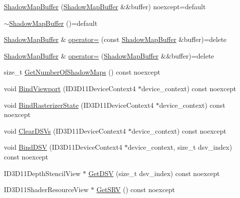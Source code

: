 \begin{DoxyCompactItemize}
\hyperlink{structmage_1_1_shadow_map_buffer_a0aa29978a2c482614aa1c46e9be0b50a}{Shadow\+Map\+Buffer} (\hyperlink{structmage_1_1_shadow_map_buffer}{Shadow\+Map\+Buffer} \&\&buffer) noexcept=default
\item 
\hyperlink{structmage_1_1_shadow_map_buffer_a34eedd164d45a009ddecc97c8739c80b}{$\sim$\+Shadow\+Map\+Buffer} ()=default
\item 
\hyperlink{structmage_1_1_shadow_map_buffer}{Shadow\+Map\+Buffer} \& \hyperlink{structmage_1_1_shadow_map_buffer_ace8a042252b8285a7f6ceb838053f7f6}{operator=} (const \hyperlink{structmage_1_1_shadow_map_buffer}{Shadow\+Map\+Buffer} \&buffer)=delete
\item 
\hyperlink{structmage_1_1_shadow_map_buffer}{Shadow\+Map\+Buffer} \& \hyperlink{structmage_1_1_shadow_map_buffer_a7ecdf05195a56dbbfbe473df2aad6ba6}{operator=} (\hyperlink{structmage_1_1_shadow_map_buffer}{Shadow\+Map\+Buffer} \&\&buffer)=delete
\item 
size\+\_\+t \hyperlink{structmage_1_1_shadow_map_buffer_ab0b78c26663aa303d8f72dc89ec25eea}{Get\+Number\+Of\+Shadow\+Maps} () const noexcept
\item 
void \hyperlink{structmage_1_1_shadow_map_buffer_ae0d097c959ff2cdb2aabdd246c654039}{Bind\+Viewport} (I\+D3\+D11\+Device\+Context4 $\ast$device\+\_\+context) const noexcept
\item 
void \hyperlink{structmage_1_1_shadow_map_buffer_a4f71a1a486049ab2455af83f6a4c0f28}{Bind\+Rasterizer\+State} (I\+D3\+D11\+Device\+Context4 $\ast$device\+\_\+context) const noexcept
\item 
void \hyperlink{structmage_1_1_shadow_map_buffer_ac2e03bb5d33f5014d9ef66df401308d9}{Clear\+D\+S\+Vs} (I\+D3\+D11\+Device\+Context4 $\ast$device\+\_\+context) const noexcept
\item 
void \hyperlink{structmage_1_1_shadow_map_buffer_a8e23dccfa670bdb4a698977b7524434e}{Bind\+D\+SV} (I\+D3\+D11\+Device\+Context4 $\ast$device\+\_\+context, size\+\_\+t dsv\+\_\+index) const noexcept
\item 
I\+D3\+D11\+Depth\+Stencil\+View $\ast$ \hyperlink{structmage_1_1_shadow_map_buffer_a8762dcdaca36c7a206dac362d387f0f1}{Get\+D\+SV} (size\+\_\+t dsv\+\_\+index) const noexcept
\item 
I\+D3\+D11\+Shader\+Resource\+View $\ast$ \hyperlink{structmage_1_1_shadow_map_buffer_a3c923d6cea528af3420085fafd8f9f8e}{Get\+S\+RV} () const noexcept
\end{DoxyCompactItemize}
